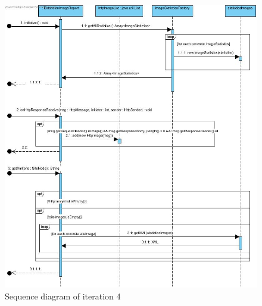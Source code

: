 \begin{figure}[h]
	\centering
	\includegraphics[width=1\textwidth]{../Diagrams/SDiteration4}
	\caption{Sequence diagram of iteration 4}
\end{figure}